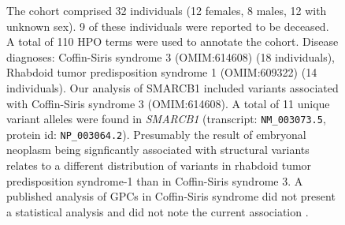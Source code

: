 \begin{figure}[htbp]
\caption{The cohort comprised 32 individuals (12 females, 8 males, 12 with unknown sex). 9 of these individuals were 
reported to be deceased. A total of 110 HPO terms were used to annotate the cohort. Disease diagnoses: 
Coffin-Siris syndrome 3 (OMIM:614608) (18 individuals), Rhabdoid tumor predisposition syndrome 1 (OMIM:609322) 
(14 individuals). Our analysis of SMARCB1 included variants associated with Coffin-Siris syndrome 3 (OMIM:614608).
A total of 11 unique variant alleles were found in \textit{SMARCB1} (transcript: \texttt{NM\_003073.5}, 
protein id: \texttt{NP\_003064.2}). Presumably the result of embryonal neoplasm being signficantly associated with structural variants relates to a 
different distribution of variants in rhabdoid tumor predisposition syndrome-1 than in Coffin-Siris syndrome 3.
A published analysis of GPCs in Coffin-Siris syndrome did not present a statistical analysis and did not note the current association \cite{PMID_25168959}.}
\end{figure}

